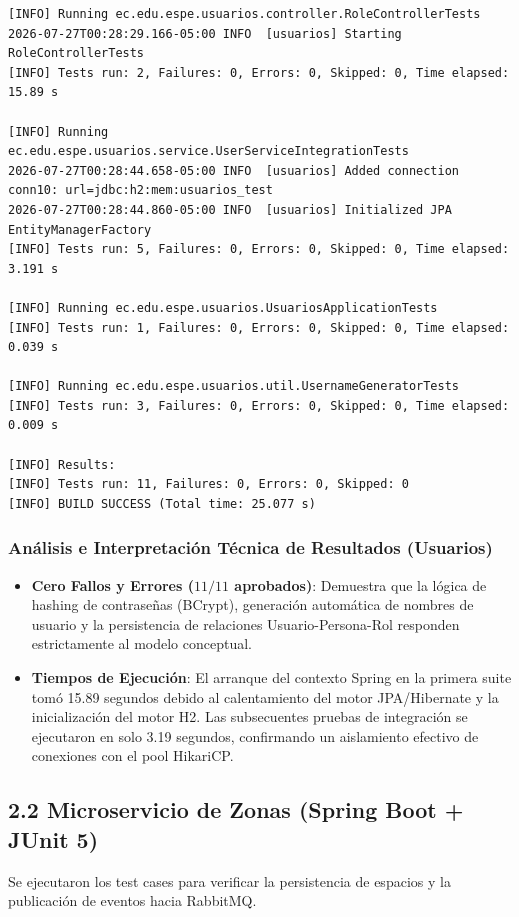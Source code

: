 \documentclass[11pt,a4paper]{article}
\begin{document}
\begin{macdraculacode}
\begin{lstlisting}
[INFO] Running ec.edu.espe.usuarios.controller.RoleControllerTests
2026-07-27T00:28:29.166-05:00 INFO  [usuarios] Starting RoleControllerTests
[INFO] Tests run: 2, Failures: 0, Errors: 0, Skipped: 0, Time elapsed: 15.89 s

[INFO] Running ec.edu.espe.usuarios.service.UserServiceIntegrationTests
2026-07-27T00:28:44.658-05:00 INFO  [usuarios] Added connection conn10: url=jdbc:h2:mem:usuarios_test
2026-07-27T00:28:44.860-05:00 INFO  [usuarios] Initialized JPA EntityManagerFactory
[INFO] Tests run: 5, Failures: 0, Errors: 0, Skipped: 0, Time elapsed: 3.191 s

[INFO] Running ec.edu.espe.usuarios.UsuariosApplicationTests
[INFO] Tests run: 1, Failures: 0, Errors: 0, Skipped: 0, Time elapsed: 0.039 s

[INFO] Running ec.edu.espe.usuarios.util.UsernameGeneratorTests
[INFO] Tests run: 3, Failures: 0, Errors: 0, Skipped: 0, Time elapsed: 0.009 s

[INFO] Results:
[INFO] Tests run: 11, Failures: 0, Errors: 0, Skipped: 0
[INFO] BUILD SUCCESS (Total time: 25.077 s)
\end{lstlisting}
\end{macdraculacode}

\subsubsection{Análisis e Interpretación Técnica de Resultados (Usuarios)}
\begin{itemize}[leftmargin=*]
    \item \textbf{Cero Fallos y Errores ($11/11$ aprobados)}: Demuestra que la lógica de hashing de contraseñas (BCrypt), generación automática de nombres de usuario y la persistencia de relaciones Usuario-Persona-Rol responden estrictamente al modelo conceptual.
    \item \textbf{Tiempos de Ejecución}: El arranque del contexto Spring en la primera suite tomó 15.89 segundos debido al calentamiento del motor JPA/Hibernate y la inicialización del motor H2. Las subsecuentes pruebas de integración se ejecutaron en solo 3.19 segundos, confirmando un aislamiento efectivo de conexiones con el pool HikariCP.
\end{itemize}

\subsection{2.2 Microservicio de Zonas (Spring Boot + JUnit 5)}
Se ejecutaron los test cases para verificar la persistencia de espacios y la publicación de eventos hacia RabbitMQ.
\end{document}

